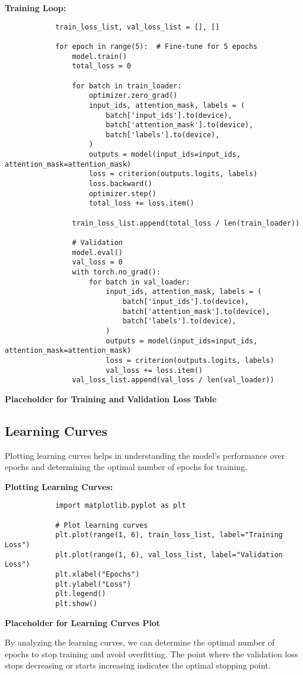         \textbf{Training Loop:}

        \begin{verbatim}
            train_loss_list, val_loss_list = [], []

            for epoch in range(5):  # Fine-tune for 5 epochs
                model.train()
                total_loss = 0

                for batch in train_loader:
                    optimizer.zero_grad()
                    input_ids, attention_mask, labels = (
                        batch['input_ids'].to(device),
                        batch['attention_mask'].to(device),
                        batch['labels'].to(device),
                    )
                    outputs = model(input_ids=input_ids, attention_mask=attention_mask)
                    loss = criterion(outputs.logits, labels)
                    loss.backward()
                    optimizer.step()
                    total_loss += loss.item()

                train_loss_list.append(total_loss / len(train_loader))

                # Validation
                model.eval()
                val_loss = 0
                with torch.no_grad():
                    for batch in val_loader:
                        input_ids, attention_mask, labels = (
                            batch['input_ids'].to(device),
                            batch['attention_mask'].to(device),
                            batch['labels'].to(device),
                        )
                        outputs = model(input_ids=input_ids, attention_mask=attention_mask)
                        loss = criterion(outputs.logits, labels)
                        val_loss += loss.item()
                val_loss_list.append(val_loss / len(val_loader))
        \end{verbatim}

        \textbf{Placeholder for Training and Validation Loss Table}
            
    \subsection{Learning Curves}
    
        Plotting learning curves helps in understanding the model's performance over epochs and determining the optimal number of epochs for training.

        \textbf{Plotting Learning Curves:}

        \begin{verbatim}
            import matplotlib.pyplot as plt

            # Plot learning curves
            plt.plot(range(1, 6), train_loss_list, label="Training Loss")
            plt.plot(range(1, 6), val_loss_list, label="Validation Loss")
            plt.xlabel("Epochs")
            plt.ylabel("Loss")
            plt.legend()
            plt.show()
        \end{verbatim}

        \textbf{Placeholder for Learning Curves Plot}

        By analyzing the learning curves, we can determine the optimal number of epochs to stop training and avoid overfitting. The point where the validation loss stops decreasing or starts increasing indicates the optimal stopping point.
